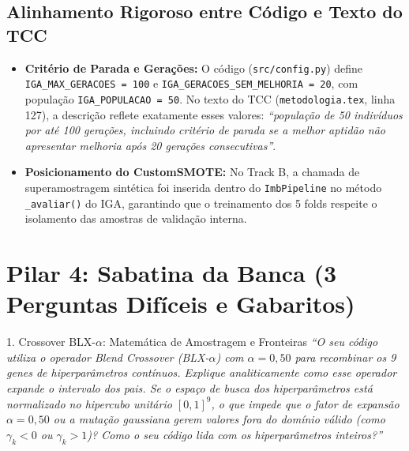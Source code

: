 \documentclass[11pt,a4paper]{article}
\begin{document}
\subsection{Alinhamento Rigoroso entre Código e Texto do TCC}
\begin{itemize}
  \item \textbf{Critério de Parada e Gerações:} O código (\texttt{src/config.py}) define \texttt{IGA\_MAX\_GERACOES = 100} e \texttt{IGA\_GERACOES\_SEM\_MELHORIA = 20}, com população \texttt{IGA\_POPULACAO = 50}. No texto do TCC (\texttt{metodologia.tex}, linha 127), a descrição reflete exatamente esses valores: \textit{“população de 50 indivíduos por até 100 gerações, incluindo critério de parada se a melhor aptidão não apresentar melhoria após 20 gerações consecutivas”}.
  \item \textbf{Posicionamento do CustomSMOTE:} No Track B, a chamada de superamostragem sintética foi inserida dentro do \texttt{ImbPipeline} no método \texttt{\_avaliar()} do IGA, garantindo que o treinamento dos 5 folds respeite o isolamento das amostras de validação interna.
\end{itemize}

\vspace{0.4cm}
\section{Pilar 4: Sabatina da Banca (3 Perguntas Difíceis e Gabaritos)}

\begin{boardQuestion}{1. Crossover BLX-$\alpha$: Matemática de Amostragem e Fronteiras}
\textit{“O seu código utiliza o operador Blend Crossover (BLX-$\alpha$) com $\alpha = 0{,}50$ para recombinar os 9 genes de hiperparâmetros contínuos. Explique analiticamente como esse operador expande o intervalo dos pais. Se o espaço de busca dos hiperparâmetros está normalizado no hipercubo unitário $[0, 1]^9$, o que impede que o fator de expansão $\alpha = 0{,}50$ ou a mutação gaussiana gerem valores fora do domínio válido (como $\gamma_k < 0$ ou $\gamma_k > 1$)? Como o seu código lida com os hiperparâmetros inteiros?”}
\end{boardQuestion}
\end{document}
